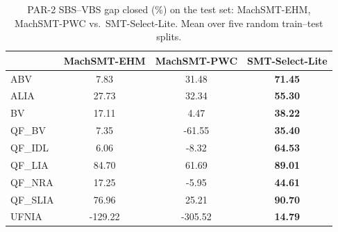 \begin{table}[ht]
\centering
\begin{tabular}{lccc}
\toprule
 & MachSMT-EHM & MachSMT-PWC & SMT-Select-Lite \\
\midrule
ABV & 7.83 & 31.48 & \textbf{71.45} \\
ALIA & 27.73 & 32.34 & \textbf{55.30} \\
BV & 17.11 & 4.47 & \textbf{38.22} \\
QF\_BV & 7.35 & -61.55 & \textbf{35.40} \\
QF\_IDL & 6.06 & -8.32 & \textbf{64.53} \\
QF\_LIA & 84.70 & 61.69 & \textbf{89.01} \\
QF\_NRA & 17.25 & -5.95 & \textbf{44.61} \\
QF\_SLIA & 76.96 & 25.21 & \textbf{90.70} \\
UFNIA & -129.22 & -305.52 & \textbf{14.79} \\
\bottomrule
\end{tabular}
\caption{PAR-2 SBS--VBS gap closed (\%) on the test set: MachSMT-EHM, MachSMT-PWC vs.\ SMT-Select-Lite. Mean over five random train--test splits.}
\label{tab:machsmt_lite_par2}
\end{table}
